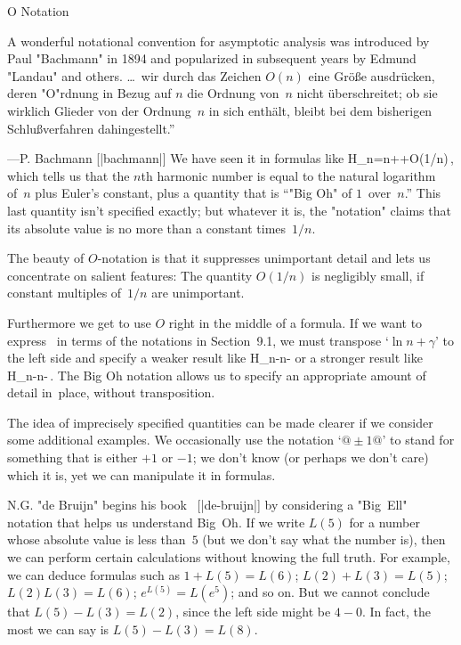  O Notation

A wonderful notational convention for asymptotic analysis was introduced
by Paul "Bachmann" in 1894 and popularized in
 subsequent years by Edmund "Landau" and others.
\g\noindent{}\dots\ wir durch das Zeichen\/ $O(n)$ eine Gr\"o\ss e ausdr\"ucken,
deren "O"rdnung in Bezug auf\/ $n$ die Ordnung von\/~$n$ nicht
\"uberschreitet; ob sie wirklich Glieder von der Ordnung\/~$n$
in sich enth\"alt, bleibt bei dem bisherigen Schlu\ss verfahren
dahingestellt.''\par\hfill\kern-4pt\dash---P. Bachmann [|bachmann|]\g
We have seen it in formulas like
\begindisplay
H_n=\ln n+\gamma+O(1/n)\,,
\eqno
\enddisplay
which tells us that the $n$th harmonic number is equal to the natural
logarithm of~$n$ plus Euler's constant, plus a quantity that is
``"Big Oh" of\/ $1$\kern-1pt~over~$n$.\qback'' This last quantity isn't specified
exactly; but whatever it is, the "notation" claims that its absolute
value is no more than a constant times~$1/n$.

The beauty of $O$-notation is that it suppresses unimportant detail
and lets us concentrate on salient features: The quantity $O(1/n)$ is
negligibly small, if constant multiples of~$1/n$ are unimportant.

Furthermore we get to use $O$ right in the middle of a formula. If we
want to express \thiseq\ in terms of the notations in Section~9.1,
we must transpose `$\ln n+\gamma$' to the left side and specify a weaker
result like
\begindisplay
H_n-\ln n-\gamma{}
\enddisplay
or a stronger result like
\begindisplay
H_n-\ln n-\gamma{}\,.
\enddisplay
The Big Oh notation allows us to specify an appropriate amount of
detail in~place, without transposition.

The idea of imprecisely specified quantities can be made clearer if
we consider some additional examples. We occasionally use the notation
`$@\pm1@$'
 to stand for something that is either $+1$ or $-1$; we don't
know (or perhaps we don't care) which it is, yet we can manipulate it
in formulas.

N.\thinspace G. "de Bruijn"
 begins his book ~[|de-bruijn|]
by considering a "Big~Ell" notation that helps us understand Big~Oh.
If we write $L(5)$ for a number whose absolute value is less than~$5$
(but we don't say what the number is), then we can perform certain
calculations without knowing the full truth. For example, we can
deduce formulas such as $1+L(5)=L(6)$; $L(2)+L(3)=L(5)$; $L(2)L(3)=L(6)$;
$e^{L(5)}=L(e^5)$; and so on. But we cannot conclude that $L(5)-L(3)=L(2)$,
since the left side might be $4-0$.
In fact, the most we can say is $L(5)-L(3)=L(8)$.

